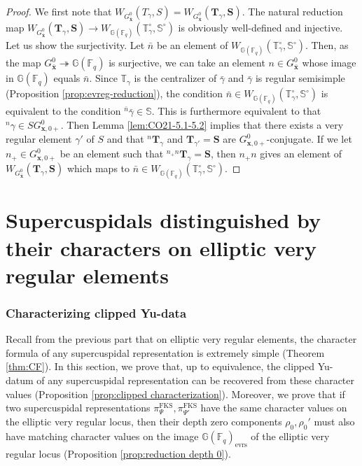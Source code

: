 \documentclass{amsart}
\newcommand{\evrs}{\mathrm{evrs}}
\newcommand{\FKS}{\mathrm{FKS}}
\newcommand{\bfT}{\mathbf{T}}
\newcommand{\x}{\mathbf{x}}
\newcommand{\bbT}{\mathbb{T}}
\newcommand{\F}{\mathbb{F}}
\newcommand{\FF}{\mathbb{F}}
\newcommand{\bbS}{\mathbb{S}}
\newcommand{\bbG}{\mathbb{G}}
\newcommand{\bfS}{\mathbf{S}}
\theoremstyle{plain}
\theoremstyle{definition}
\theoremstyle{remark}
\theoremstyle{theorem}
\begin{document}
\begin{proof}
We first note that $W_{G^{0}_{\bar{\x}}}(T_{\gamma},S)=W_{G^{0}_{\bar{\x}}}(\bfT_{\gamma},\bfS)$.
The natural reduction map $W_{G^{0}_{\bar{\x}}}(\bfT_{\gamma},\bfS)\rightarrow W_{\bbG(\F_{q})}(\bbT^{\circ}_{\gamma},\bbS^{\circ})$ is obviously well-defined and injective.
Let us show the surjectivity.
Let $\bar{n}$ be an element of $W_{\bbG(\F_{q})}(\bbT^{\circ}_{\gamma},\bbS^{\circ})$.
Then, as the map $G^{0}_{\bar{\x}}\twoheadrightarrow\bbG(\F_{q})$ is surjective, we can take an element $n\in G^{0}_{\bar{\x}}$ whose image in $\bbG(\F_{q})$ equals $\bar{n}$.
Since $\bbT_{\gamma}$ is the centralizer of $\bar{\gamma}$ and $\bar{\gamma}$ is regular semisimple (Proposition \ref{prop:evreg-reduction}), the condition $\bar{n}\in W_{\bbG(\F_{q})}(\bbT^{\circ}_{\gamma},\bbS^{\circ})$ is equivalent to the condition ${}^{\bar{n}}\bar{\gamma}\in\bbS$.
This is furthermore equivalent to that ${}^{n}\gamma\in SG^{0}_{\x,0+}$.
Then Lemma \ref{lem:CO21-5.1-5.2} implies that there exists a very regular element $\gamma'$ of $S$ and that ${}^{n}\bfT_{\gamma}$ and $\bfT_{\gamma'}=\bfS$ are $G^{0}_{\x,0+}$-conjugate.
If we let $n_{+}\in G^{0}_{\x,0+}$ be an element such that ${}^{n_{+}n}\bfT_{\gamma}=\bfS$, then $n_{+}n$ gives an element of $W_{G^{0}_{\bar{\x}}}(\bfT_{\gamma},\bfS)$ which maps to $\bar{n}\in W_{\bbG(\F_{q})}(\bbT^{\circ}_{\gamma},\bbS^{\circ})$.
\end{proof}


\newpage

\part{Supercuspidals distinguished by their characters on elliptic very regular elements}\label{part:characterization}


\section{Characterizing clipped Yu-data}\label{sec:clipped p-adic}

Recall from the previous part that on elliptic very regular elements, the character formula of any supercuspidal representation is extremely simple (Theorem \ref{thm:CF}). In this section, we prove that, up to equivalence, the clipped Yu-datum of any supercuspidal representation can be recovered from these character values (Proposition \ref{prop:clipped characterization}). Moreover, we prove that if two supercuspidal representations $\pi_\Psi^\FKS, \pi_{\Psi'}^\FKS$ have the same character values on the elliptic very regular locus, then their depth zero components $\rho_0, \rho_0'$ must also have matching character values on the image $\bbG(\FF_q)_\evrs$ of the elliptic very regular locus (Proposition \ref{prop:reduction depth 0}).
\end{document}
